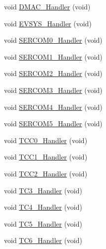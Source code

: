 \begin{DoxyCompactItemize}
\item 
void \mbox{\hyperlink{group___s_a_m_d21_g16_l__cmsis_ga8e064c26f3a32acb9fcd7bfac1fc45a6}{D\+M\+A\+C\+\_\+\+Handler}} (void)
\item 
void \mbox{\hyperlink{group___s_a_m_d21_g16_l__cmsis_gabe3895797afdd885a182036e3ab0060b}{E\+V\+S\+Y\+S\+\_\+\+Handler}} (void)
\item 
void \mbox{\hyperlink{group___s_a_m_d21_g16_l__cmsis_ga14a9a5fe00eb8d6cd9e3790e49043ed9}{S\+E\+R\+C\+O\+M0\+\_\+\+Handler}} (void)
\item 
void \mbox{\hyperlink{group___s_a_m_d21_g16_l__cmsis_gafb091253d0785769e80682915752b5c4}{S\+E\+R\+C\+O\+M1\+\_\+\+Handler}} (void)
\item 
void \mbox{\hyperlink{group___s_a_m_d21_g16_l__cmsis_ga3625c4b87bfd7bd2a5fdbdce6046a840}{S\+E\+R\+C\+O\+M2\+\_\+\+Handler}} (void)
\item 
void \mbox{\hyperlink{group___s_a_m_d21_g16_l__cmsis_ga5b1bbdf8e669c1b17736584dff204599}{S\+E\+R\+C\+O\+M3\+\_\+\+Handler}} (void)
\item 
void \mbox{\hyperlink{group___s_a_m_d21_g16_l__cmsis_ga39ad83aaf151456b1c4b3087ead0f892}{S\+E\+R\+C\+O\+M4\+\_\+\+Handler}} (void)
\item 
void \mbox{\hyperlink{group___s_a_m_d21_g16_l__cmsis_ga161a0db2be887e8495fa5c23d0862824}{S\+E\+R\+C\+O\+M5\+\_\+\+Handler}} (void)
\item 
void \mbox{\hyperlink{group___s_a_m_d21_g16_l__cmsis_gaff4b3092699ca4f7382621f3443688a3}{T\+C\+C0\+\_\+\+Handler}} (void)
\item 
void \mbox{\hyperlink{group___s_a_m_d21_g16_l__cmsis_gaaa9421127bf93f9b4ccfb0a6ffcf94c2}{T\+C\+C1\+\_\+\+Handler}} (void)
\item 
void \mbox{\hyperlink{group___s_a_m_d21_g16_l__cmsis_ga5dccf47df0e19e941bc4758a82db1906}{T\+C\+C2\+\_\+\+Handler}} (void)
\item 
void \mbox{\hyperlink{group___s_a_m_d21_g16_l__cmsis_gae69893861c9ce728a475a17e26296582}{T\+C3\+\_\+\+Handler}} (void)
\item 
void \mbox{\hyperlink{group___s_a_m_d21_g16_l__cmsis_ga0c1fbde5812fec0be065efcc9d864efd}{T\+C4\+\_\+\+Handler}} (void)
\item 
void \mbox{\hyperlink{group___s_a_m_d21_g16_l__cmsis_gab72ac9948c9e1d1a59863025b29f70c4}{T\+C5\+\_\+\+Handler}} (void)
\item 
void \mbox{\hyperlink{group___s_a_m_d21_g16_l__cmsis_gad9c197abe5d8e9eeeb1164d729c3f441}{T\+C6\+\_\+\+Handler}} (void)
\item 

\end{DoxyCompactItemize}
